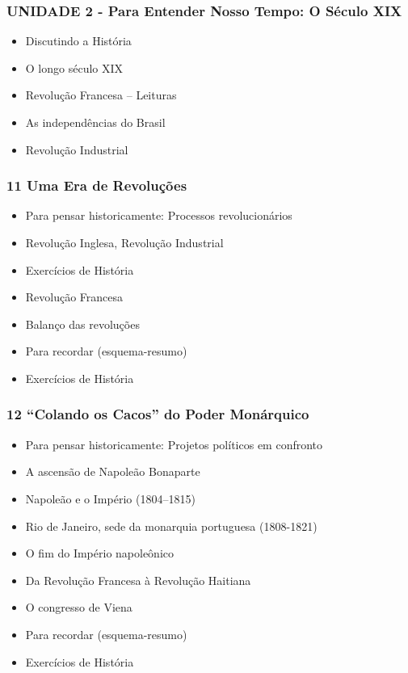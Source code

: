 \documentclass[a4paper,12pt]{article}[abntex2]
\begin{document}
\subsubsection*{UNIDADE 2 - Para Entender Nosso Tempo: O Século XIX}

\begin{itemize}
\item Discutindo a História
\item O longo século XIX
\item Revolução Francesa – Leituras
\item As independências do Brasil
\item Revolução Industrial
\end{itemize}
\subsubsection*{11 Uma Era de Revoluções}

\begin{itemize}
\item Para pensar historicamente: Processos revolucionários
\item Revolução Inglesa, Revolução Industrial
\item Exercícios de História
\item Revolução Francesa
\item Balanço das revoluções
\item Para recordar (esquema-resumo)
\item Exercícios de História
\end{itemize}
\subsubsection*{12 “Colando os Cacos” do Poder Monárquico}

\begin{itemize}
\item Para pensar historicamente: Projetos políticos em confronto
\item A ascensão de Napoleão Bonaparte
\item Napoleão e o Império (1804–1815)
\item Rio de Janeiro, sede da monarquia portuguesa (1808-1821)
\item O fim do Império napoleônico
\item Da Revolução Francesa à Revolução Haitiana
\item O congresso de Viena
\item Para recordar (esquema-resumo)
\item Exercícios de História
\end{itemize}
\end{document}
